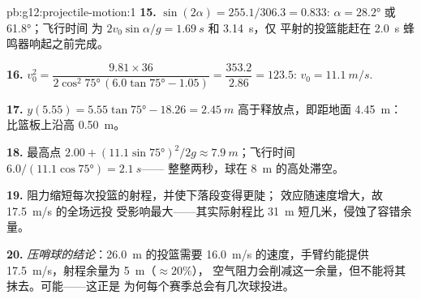 \begin{solution}{pb:g12:projectile-motion:1}
\textbf{15.} $\sin(2\alpha) = 255.1/306.3 = 0.833$:
$\alpha = \ang{28.2}$ 或 \ang{61.8}；飞行时间
为 $2v_0\sin\alpha/g = \qty{1.69}{s}$ 和 \qty{3.14}{s}，仅
平射的投篮能赶在 \qty{2.0}{s} 蜂鸣器响起之前完成。

\textbf{16.} $v_0^2 = \dfrac{9.81 \times 36}{2\cos^2\ang{75}\,
(6.0\tan\ang{75} - 1.05)} = \dfrac{353.2}{2.86} = 123.5$:
$v_0 = \qty{11.1}{m/s}$.

\textbf{17.} $y(5.55) = 5.55\tan\ang{75} - 18.26 = \qty{2.45}{m}$
高于释放点，即距地面 \qty{4.45}{m}：
比篮板上沿高 \qty{0.50}{m}。

\textbf{18.} 最高点 $2.00 + (11.1\sin\ang{75})^2/2g \approx
\qty{7.9}{m}$；飞行时间 $6.0/(11.1\cos\ang{75}) = \qty{2.1}{s}$——
整整两秒，球在 \qty{8}{m} 的高处滞空。

\textbf{19.} 阻力缩短每次投篮的射程，并使下落段变得更陡；
效应随速度增大，故 \qty{17.5}{m/s} 的全场远投
受影响最大——其实际射程比
\qty{31}{m} 短几米，侵蚀了容错余量。

\textbf{20.} \emph{压哨球的结论}：\qty{26.0}{m}
的投篮需要 \qty{16.0}{m/s} 的速度，手臂约能提供
\qty{17.5}{m/s}，射程余量为 \qty{5}{m}（$\approx 20\%$），
空气阻力会削减这一余量，但不能将其抹去。可能——这正是
为何每个赛季总会有几次球投进。
\end{solution}
